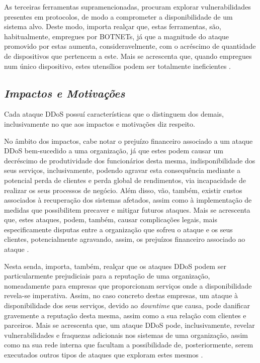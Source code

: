 As terceiras ferramentas supramencionadas, procuram explorar vulnerabilidades presentes em protocolos, de modo a comprometer a disponibilidade de um sistema alvo. Deste modo, importa realçar que, estas ferramentas, são, habitualmente, empregues por BOTNETs, já que a magnitude do ataque promovido por estas aumenta, consideravelmente, com o acréscimo de quantidade de dispositivos que pertencem a este. Mais se acrescenta que, quando empregues num único dispositivo, estes utensílios podem ser totalmente ineficientes \cite{cloudflare_ddos_tools}.

\subsection{\textit{Impactos e Motivações}}
Cada ataque DDoS possuí características que o distinguem dos demais, inclusivamente no que aos impactos e motivações diz respeito.


No âmbito dos impactos, cabe notar o prejuízo financeiro associado a um ataque DDoS bem-sucedido a uma organização, já que estes podem causar um decréscimo de produtividade dos funcionários desta mesma, indisponibilidade dos seus serviços, inclusivamente, podendo agravar esta consequência mediante a potencial perda de clientes e perda global de rendimentos, via incapacidade de realizar os seus processos de negócio. Além disso, vão, também, existir custos associados à recuperação dos sistemas afetados, assim como à implementação de medidas que possibilitem precaver e mitigar futuros ataques. Mais se acrescenta que, estes ataques, podem, também, causar complicações legais, mais especificamente disputas entre a organização que sofreu o ataque e os seus clientes, potencialmente agravando, assim, os prejuízos financeiro associado ao ataque \cite{connectwise_types_of_ddos_attacks,cybergc_defending_agaisnt_ddos,stormwall_impacts_ddos}.

Nesta senda, importa, também, realçar que os ataques DDoS podem ser particularmente prejudiciais para a reputação de uma organização, nomeadamente para empresas que proporcionam serviços onde a disponibilidade revela-se imperativa. Assim, no caso concreto destas empresas, um ataque à disponibilidade dos seus serviços, devido ao \textit{downtime} que causa, pode danificar gravemente a reputação desta mesma, assim como a sua relação com clientes e parceiros. Mais se acrescenta que, um ataque DDoS pode, inclusivamente, revelar vulnerabilidades e fraquezas adicionais nos sistemas de uma organização, assim como na sua rede interna que facultam a possibilidade de, posteriormente, serem executados outros tipos de ataques que exploram estes mesmos \cite{connectwise_types_of_ddos_attacks,cybergc_defending_agaisnt_ddos,stormwall_impacts_ddos}.


